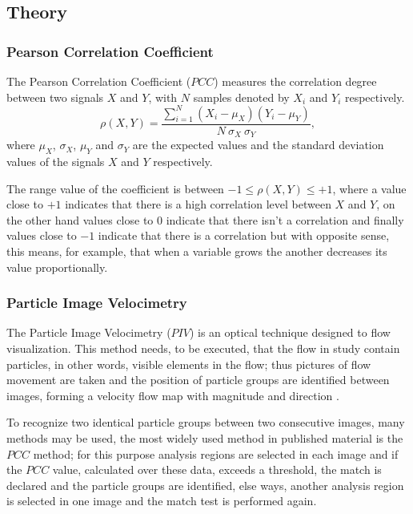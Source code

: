 \subsection{Theory}
\subsubsection{Pearson Correlation Coefficient}
The Pearson Correlation Coefficient ($PCC$) \cite{Pearson} measures the correlation degree between two
signals $X$ and $Y$, with $N$ samples denoted by $X_i$ and $Y_i$ respectively.
\begin{equation}
 \rho(X,Y)=\frac{\sum\limits_{i=1}^{N} (X_i-\mu_{X})(Y_i-\mu_{Y})}{N~\sigma_{X}~\sigma_{Y}},
\end{equation} 
where $\mu_{X}$, $\sigma_{X}$, $\mu_{Y}$ and $\sigma_{Y}$ are the expected values and 
the standard deviation values of the signals $X$ and $Y$ respectively.

The range value of the coefficient is between $-1 \leq \rho(X,Y) \leq +1$, where a value close
to $+1$ indicates that there is a high correlation level between $X$ and $Y$, 
on the other hand values close to $0$ indicate that there isn't a correlation and 
finally values close to $-1$ indicate that there is a correlation but with opposite sense,
this means, for example, that when a variable grows the another decreases its value proportionally.

\subsubsection{Particle Image Velocimetry}
The Particle Image Velocimetry ($PIV$) is an optical technique designed 
to flow visualization.
This method needs, to be executed, that the flow in study contain particles, in other words, 
visible elements in the flow; thus
pictures of flow movement are taken and the position of particle groups are
identified between images, forming  a velocity flow map with magnitude and direction \cite{piv1}.

To recognize two identical particle groups between two consecutive images,
many methods may be used, the most widely used method in published material is the
$PCC$ method; for this purpose analysis regions are selected in each image
and if the $PCC$ value, calculated over these data, 
exceeds a threshold, the match is declared and the particle groups
are identified, else ways, another analysis region is selected in  one image and the match test
is performed again.


